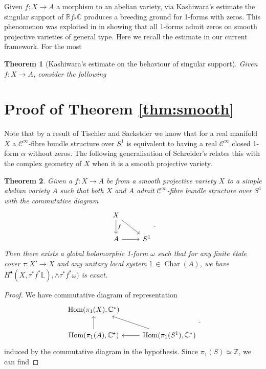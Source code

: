 \documentclass[12pt,reqno]{amsart}
\newtheorem{theorem}{Theorem}[section]
\theoremstyle{question}
\theoremstyle{definition}
\theoremstyle{remark}
\theoremstyle{cited}
\theoremstyle{citeddef}
\newcommand{\Hom}{\mathrm{Hom}}
\DeclareMathOperator{\Char}{Char}
\newcommand{\bbC}{\mathbb{C}}
\newcommand{\bbL}{\mathbb{L}}
\newcommand{\bbR}{\mathbb{R}}
\newcommand{\bbZ}{\mathbb{Z}}
\newcommand{\scrC}{\mathscr{C}}
\begin{document}
Given $f\colon X\to A$ a morphism to an abelian
variety, via Kashiwara's estimate the singular support of $\bbR f_*\bbC$ produces a breeding ground for 1-forms with zeros. This phenomenon was exploited in
\cite{PS14}
in showing that all 1-forms admit zeros on smooth projective
varieties of general type. Here we recall the estimate in our
current framework. For the most 
\begin{theorem}[Kashiwara's estimate on the behaviour of singular support]
Given $f\colon X\to A$, consider the following

\label{thm:}
\end{theorem}






\section{Proof of Theorem \ref{thm:smooth}}
Note that by a result of Tischler \cite[Theorem 1]{Tis70} and Sackstder \cite[p.\ 96]{Sac65} we know that for a real manifold $X$
a $\scrC^{\infty}$-fibre bundle structure over $S^1$ is equivalent to having a real $\scrC^{\infty}$ closed 1-form $\alpha$ without zeros. 
The following generalisation of Schreider's \cite[Theorem 1.2]{Sch19} relates this with the complex geometry of $X$ when it is a smooth projective variety.

\begin{theorem}
Given a $f\colon X\to A$ be from a smooth projective variety $X$ to a simple abelian variety $A$ such that
both $X$ and $A$ admit $\scrC^{\infty}$-fibre bundle structure over $S^1$ with the commutative diagram
\[\begin{tikzcd}
	X\ar[dr]\ar[d, "f"]& \\
	A\ar[r]&S^1
\end{tikzcd}.\]  
Then there exists a global holomorphic 1-form $\omega$ such that for any finite \'etale cover $\tau\colon X' \to X$ and
any unitary local system $\bbL\in \Char(A)$, we have $H^{\bullet}(X, \tau^*f^*\bbL), \wedge\tau^*f^*\omega)$ is exact. 
\label{thm:schreieder}
\end{theorem} 

\begin{proof}
We have commutative diagram of representation
\[\begin{tikzcd}
\Hom(\pi_1(X), \bbC^{\star})& \\
\Hom(\pi_1(A), \bbC^{\star})\ar[u]&\Hom(\pi_1(S^1),\bbC^*)\ar[l]\ar[lu]
\end{tikzcd}.\]  
induced by the commutative diagram in the hypothesis. Since $\pi_1(S) \simeq \bbZ$, we can find 
\end{proof}
\end{document}

